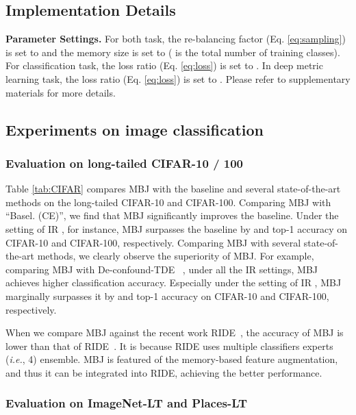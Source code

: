 \documentclass[final]{cvpr}
\begin{document}
\subsection{Implementation Details} \label{sec:imp}
\noindent \textbf{Parameter Settings.} For both task, the re-balancing factor  (Eq. \ref{eq:sampling}) is set to  and the memory size is set to  ( is the total number of training classes). For classification task, the loss ratio  (Eq. \ref{eq:loss}) is set to . In deep metric learning task, the loss ratio  (Eq. \ref{eq:loss}) is set to . Please refer to supplementary materials for more details. 

\subsection{Experiments on image classification}\label{sec:cls_exp}

\subsubsection{Evaluation  on long-tailed CIFAR-10 / 100}

Table \ref{tab:CIFAR} compares MBJ with the baseline and several state-of-the-art methods on the long-tailed CIFAR-10 and CIFAR-100.
Comparing MBJ with ``Basel. (CE)'', we find that MBJ significantly improves the baseline.  Under the setting of IR , for instance, MBJ surpasses the baseline by  and  top-1 accuracy on CIFAR-10 and CIFAR-100, respectively. Comparing MBJ with several state-of-the-art methods, we clearly observe the superiority of MBJ. For example, comparing MBJ with De-confound-TDE ~\cite{tang2020long}, under all the IR settings, MBJ achieves higher classification accuracy. Especially under the setting of IR , MBJ marginally surpasses it by   and  top-1 accuracy on CIFAR-10 and CIFAR-100, respectively.

When we compare MBJ against the recent work RIDE~\cite{wang2020long}, the accuracy of MBJ is lower than that of RIDE~\cite{wang2020long}. It is because RIDE uses multiple classifiers experts (\emph{i.e.}, 4) ensemble. MBJ is featured of the memory-based feature augmentation, and thus it can be integrated into RIDE, achieving the better performance.



\subsubsection{Evaluation on ImageNet-LT and Places-LT}
\end{document}
